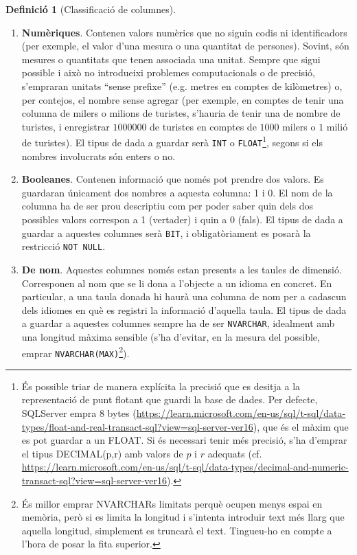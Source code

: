 \documentclass{article}
\theoremstyle{definition}
\newtheorem{definition}{Definició}
\begin{document}
\begin{definition}[Classificació de columnes]
\begin{enumerate}
    \item \textbf{Numèriques}. Contenen valors numèrics que no siguin codis ni identificadors (per exemple, el valor d'una mesura o una quantitat de persones). Sovint, són mesures o quantitats que tenen associada una unitat. Sempre que sigui possible i això no introdueixi problemes computacionals o de precisió, s'empraran unitats ``sense prefixe'' (e.g. metres en comptes de kilòmetres) o, per contejos, el nombre sense agregar (per exemple, en comptes de tenir una columna de milers o milions de turistes, s'hauria de tenir una de nombre de turistes, i enregistrar $1000000$ de turistes en comptes de $1000$ milers o $1$ milió de turistes). El tipus de dada a guardar serà \verb|INT| o \verb|FLOAT|\footnote{
    És possible triar de manera explícita la precisió que es desitja a la representació de punt flotant que guardi la base de dades. Per defecte, SQLServer empra 8 bytes (\href{https://learn.microsoft.com/en-us/sql/t-sql/data-types/float-and-real-transact-sql?view=sql-server-ver16}{https://learn.microsoft.com/en-us/sql/t-sql/data-types/float-and-real-transact-sql?view=sql-server-ver16}), que és el màxim que es pot guardar a un FLOAT. Si és necessari tenir més precisió, s'ha d'emprar el tipus DECIMAL(p,r) amb valors de $p$ i $r$ adequats (cf. \href{https://learn.microsoft.com/en-us/sql/t-sql/data-types/decimal-and-numeric-transact-sql?view=sql-server-ver16}{https://learn.microsoft.com/en-us/sql/t-sql/data-types/decimal-and-numeric-transact-sql?view=sql-server-ver16}).
    }, segons si els nombres involucrats són enters o no.

    \item \textbf{Booleanes}. Contenen informació que només pot prendre dos valors. Es guardaran únicament dos nombres a aquesta columna: 1 i 0. El nom de la columna ha de ser prou descriptiu com per poder saber quin dels dos possibles valors correspon a 1 (vertader) i quin a 0 (fals). El tipus de dada a guardar a aquestes columnes serà \verb|BIT|, i obligatòriament es posarà la restricció \verb|NOT NULL|.

    \item \textbf{De nom}. Aquestes columnes només estan presents a les taules de dimensió. Corresponen al nom que se li dona a l'objecte a un idioma en concret. En particular, a una taula donada hi haurà una columna de nom per a cadascun dels idiomes en què es registri la informació d'aquella taula. El tipus de dada a guardar a aquestes columnes sempre ha de ser \verb|NVARCHAR|, idealment amb una longitud màxima sensible (s'ha d'evitar, en la mesura del possible, emprar \verb|NVARCHAR(MAX)|\footnote{És millor emprar NVARCHARs limitats perquè ocupen menys espai en memòria, però si es limita la longitud i s'intenta introduir text més llarg que aquella longitud, simplement es truncarà el text. Tingueu-ho en compte a l'hora de posar la fita superior.}).


\end{enumerate}
\end{definition}
\end{document}
